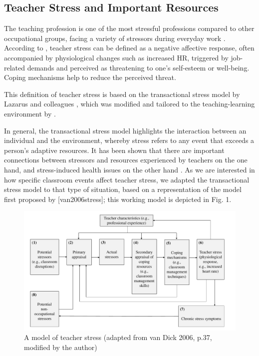 \documentclass[preprint, 3p,
authoryear]{elsarticle} %
\begin{document}
\subsection{Teacher Stress and Important
Resources}\label{teacher-stress-and-important-resources}

The teaching profession is one of the most stressful professions
compared to other occupational groups, facing a variety of stressors
during everyday work \citep{smith2000, herman2020, schult2014belastet}.
According to \citet{kyriacou1978}, teacher stress can be defined as a
negative affective response, often accompanied by physiological changes
such as increased HR, triggered by job-related demands and perceived as
threatening to one's self-esteem or well-being. Coping mechanisms help
to reduce the perceived threat.

This definition of teacher stress is based on the transactional stress
model by Lazarus and colleagues
\citep{lazarus1981stressbezogene, lazarus1984stress}, which was modified
and tailored to the teaching-learning environment by
\citet{kyriacou1978}.

In general, the transactional stress model \citep{lazarus1990theory}
highlights the interaction between an individual and the environment,
whereby stress refers to any event that exceeds a person's adaptive
resources. It has been shown that there are important connections
between stressors and resources experienced by teachers on the one hand,
and stress-induced health issues on the other hand
\citep{krause2013messung}. As we are interested in how specific
classroom events affect teacher stress, we adapted the transactional
stress model to that type of situation, based on a representation of the
model first proposed by {[}van2006stress{]}; this working model is
depicted in Fig. 1.

\begin{figure}[htbp]
  \centering
  \includegraphics[width=1\textwidth]{images/Model_Teacher_Stress_adapted_new.pdf}
  \caption{A model of teacher stress (adapted from van Dick 2006, p.37, modified by the author)}
  \label{A model of teacher stress (adapted from van Dick 2006, p.37, modified by the author)}
\end{figure}
\end{document}
